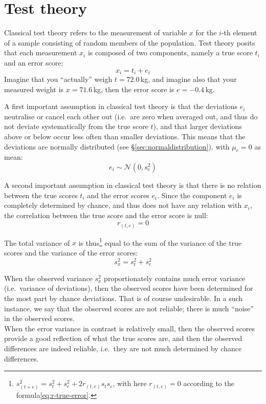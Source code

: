 \documentclass[
]{book}
\begin{document}
\hypertarget{test-theory}{%
\section{Test theory}\label{test-theory}}

Classical test theory refers to the measurement of variable \(x\)
for the \(i\)-th element of a sample consisting of random members of the
population. Test theory posits that each measurement \(x_i\) is composed
of two components, namely a true score \(t_i\) and an error score:\\
\begin{equation}
  x_i = t_i + e_i
  \label{eq:obs-true-error}
\end{equation}
Imagine that you ``actually'' weigh \(t=72.0\) kg, and imagine also
that your measured weight is \(x=71.6\) kg, then the error score
is \(e=-0.4\) kg.

A first important assumption in classical test theory is that
the deviations \(e_i\) neutralise or cancel each other out (i.e.~are zero when averaged
out, and thus do not deviate systematically from the true score \(t\)), and
that larger deviations above or below occur less often than smaller
deviations. This means that the deviations are normally distributed (see
§\ref{sec:normaldistribution}), with \(\mu_e=0\) as mean:
\begin{equation}
  \label{eq:normal-error}
  e_i \sim \mathcal{N}(0,s^2_e)
\end{equation}

A second important assumption in classical test theory is that there
is no relation between the true scores \(t_i\) and the error scores \(e_i\).
Since the component \(e_i\) is completely determined by chance, and thus does not
have any relation with \(x_i\), the correlation between the true score and
the error score is null:
\begin{equation}
  \label{eq:r-true-error}
  r_{(t,e)} = 0
\end{equation}

The total variance of \(x\) is thus\footnote{\(s^2_{(t+e)} = s^2_t + s^2_e + 2 r_{(t,e)} s_t s_e\), with here \(r_{(t,e)}=0\) according to the formula\eqref{eq:r-true-error}.} equal to the sum of the variance
of the true scores and the variance of the error scores:
\begin{equation}
  \label{eq:var-true-error}
  s^2_x = s^2_t + s^2_e
\end{equation}

When the observed variance \(s^2_x\) proportionately contains much
error variance (i.e.~variance of deviations), then the observed scores
have been determined for the most part by chance deviations. That is of course
undesirable. In a such instance, we say that the observed scores
are not reliable; there is much ``noise'' in the observed scores.\\
When the error variance in contrast is relatively small, then
the observed scores provide a good reflection of what the true scores are,
and then the observed differences are indeed reliable, i.e.~they
are not much determined by chance differences.
\end{document}
